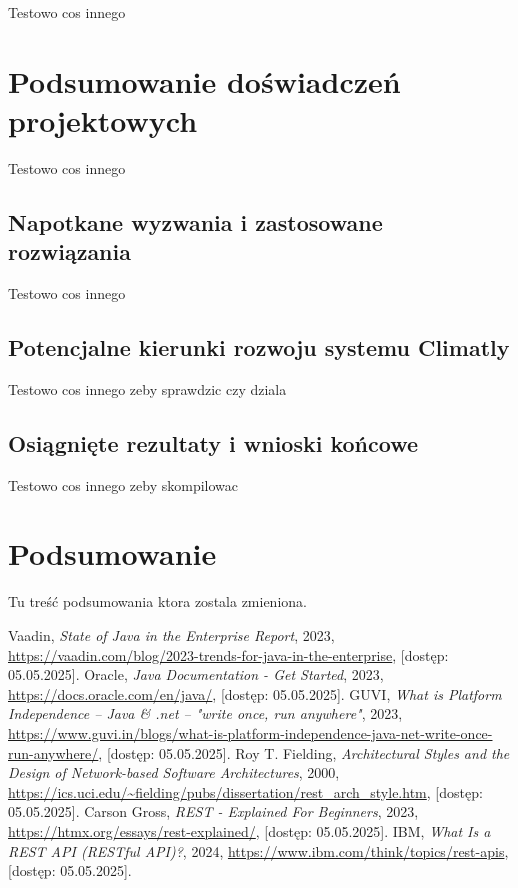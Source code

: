 \documentclass[a4paper,12pt,openany]{book}
\renewcommand{\chaptermark}[1]{\markboth{#1}{}}
\begin{document}
Testowo cos innego


\chapter{Podsumowanie doświadczeń projektowych}

Testowo cos innego

\section{Napotkane wyzwania i zastosowane rozwiązania}

Testowo cos innego

\section{Potencjalne kierunki rozwoju systemu Climatly}

Testowo cos innego zeby sprawdzic czy dziala

\section{Osiągnięte rezultaty i wnioski końcowe}

Testowo cos innego zeby skompilowac

\chapter*{Podsumowanie}
\chaptermark{Podsumowanie}

Tu treść podsumowania ktora zostala zmieniona.


\listoffigures{} %

\begin{thebibliography}{99}
 Vaadin, \textit{State of Java in the Enterprise Report}, 2023, \url{https://vaadin.com/blog/2023-trends-for-java-in-the-enterprise}, [dostęp: 05.05.2025].
 Oracle, \textit{Java Documentation - Get Started}, 2023, \url{https://docs.oracle.com/en/java/}, [dostęp: 05.05.2025].
 GUVI, \textit{What is Platform Independence – Java \& .net – "write once, run anywhere"}, 2023, \url{https://www.guvi.in/blogs/what-is-platform-independence-java-net-write-once-run-anywhere/}, [dostęp: 05.05.2025].
 Roy T. Fielding, \textit{Architectural Styles and the Design of Network-based Software Architectures}, 2000, \url{https://ics.uci.edu/~fielding/pubs/dissertation/rest_arch_style.htm}, [dostęp: 05.05.2025].
 Carson Gross, \textit{REST - Explained For Beginners}, 2023, \url{https://htmx.org/essays/rest-explained/}, [dostęp: 05.05.2025].
 IBM, \textit{What Is a REST API (RESTful API)?}, 2024, \url{https://www.ibm.com/think/topics/rest-apis}, [dostęp: 05.05.2025].
\end{thebibliography}
\end{document}
